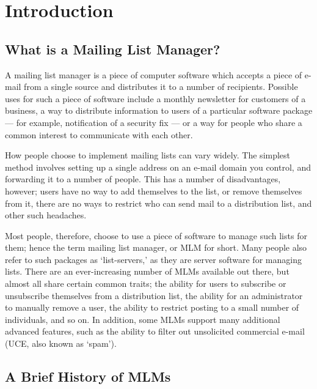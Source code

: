 \documentclass{book}
\begin{document}
\tableofcontents



\mainmatter


\chapter{Introduction}
\label{int}
\section{What is a Mailing List Manager?}
\label{int:whatis}

A mailing list manager is a piece of computer software which accepts a piece
of e-mail from a single source and distributes it to a number of recipients.
Possible uses for such a piece of software include a monthly newsletter for
customers of a business, a way to distribute information to users of a
particular software package --- for example, notification of a security fix
--- or a way for people who share a common interest to communicate with each
other.
   
How people choose to implement mailing lists can vary widely.  The simplest
method involves setting up a single address on an e-mail domain you control,
and forwarding it to a number of people.  This has a number of disadvantages,
however; users have no way to add themselves to the list, or remove themselves
from it, there are no ways to restrict who can send mail to a distribution
list, and other such headaches.
   
Most people, therefore, choose to use a piece of software to manage such lists
for them; hence the term mailing list manager, or MLM for short.  Many people
also refer to such packages as `list-servers,' as they are server software for
managing lists.  There are an ever-increasing number of MLMs available out
there, but almost all share certain common traits; the ability for users to
subscribe or unsubscribe themselves from a distribution list, the ability for
an administrator to manually remove a user, the ability to restrict posting to
a small number of individuals, and so on.  In addition, some MLMs support many
additional advanced features, such as the ability to filter out unsolicited
commercial e-mail (UCE, also known as `spam').
   
\section{A Brief History of MLMs}
\label{int:history}
\end{document}
